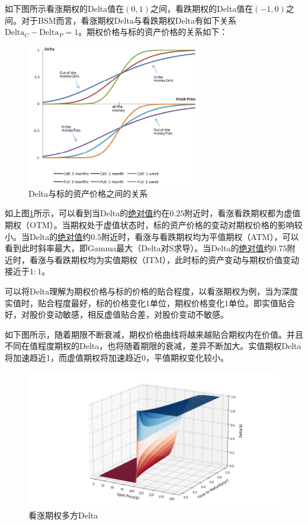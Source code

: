 \documentclass[11pt]{article}
\begin{document}
如下图所示看涨期权的Delta值在$(0,1)$之间，看跌期权的Delta值在$(-1,0)$之间。对于BSM而言，看涨期权Delta与看跌期权Delta有如下关系$\text{Delta}_C - \text{Delta}_P = 1$。期权价格与标的资产价格的关系如下：
\begin{figure}[H]
    \centering
    \includegraphics[width=0.68\textwidth]{fig/delta_stock.png}
    \caption{Delta与标的资产价格之间的关系}
    \label{fig:delta_stock}
\end{figure}

如上图\ref{fig:delta_stock}所示，可以看到当Delta的\uline{绝对值}约在$0.25$附近时，看涨看跌期权都为虚值期权（OTM）。当期权处于虚值状态时，标的资产价格的变动对期权价格的影响较小。当Delta的\uline{绝对值}约$0.5$附近时，看涨与看跌期权均为平值期权（ATM），可以看到此时斜率最大，即Gamma最大（Delta对S求导）。当Delta的\uline{绝对值}约$0.75$附近时，看涨与看跌期权均为实值期权（ITM），此时标的资产变动与期权价值变动接近于$1:1$。

可以将Delta理解为期权价格与标的价格的贴合程度，以看涨期权为例，当为深度实值时，贴合程度最好，标的价格变化1单位，期权价格变化1单位。即实值贴合好，对股价变动敏感，相反虚值贴合差，对股价变动不敏感。

如下图所示，随着期限不断衰减，期权价格曲线将越来越贴合期权内在价值。并且不同在值程度期权的Delta，也将随着期限的衰减，差异不断加大。实值期权Delta将加速趋近1，而虚值期权将加速趋近0，平值期权变化较小。
\begin{figure}[H]
    \centering
    \includegraphics[width=\textwidth]{fig/delta_call_surf.png}
    \caption{看涨期权多方Delta}
    \label{fig:delta_call_surf}
\end{figure}
\end{document}
